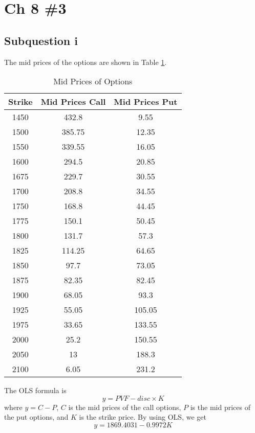 \documentclass{article}
\DeclareMathOperator{\1}{\mathit{1}}
\numberwithin{figure}{section} %
\numberwithin{table}{section}
\begin{document}
\section{Ch 8 \#3}
\subsection{Subquestion i}

The mid prices of the options are shown in Table \ref{tab:midPrice}.

	\begin{table}[hbtp]
	\centering
    \caption{\label{tab:midPrice}%
    Mid Prices of Options}
    \small
    \begin{tabular}{ccc}
    \hline\hline
    \bf{Strike} & \bf{Mid Prices Call} & \bf{Mid Prices Put}\\ 
    \hline
1450 & 432.8 & 9.55\\
1500 & 385.75 & 12.35\\
1550 & 339.55 & 16.05\\
1600 & 294.5 & 20.85\\
1675 & 229.7 & 30.55\\
1700 & 208.8 & 34.55\\
1750 & 168.8 & 44.45\\
1775 & 150.1 & 50.45\\
1800 & 131.7 & 57.3\\
1825 & 114.25 & 64.65\\
1850 & 97.7 & 73.05\\
1875 & 82.35 & 82.45\\
1900 & 68.05 & 93.3\\
1925 & 55.05 & 105.05\\
1975 & 33.65 & 133.55\\
2000 & 25.2 & 150.55\\
2050 & 13 & 188.3\\
2100 & 6.05 & 231.2\\
    \hline\hline
    \end{tabular}
    \end{table}
    
The OLS formula is
	\begin{equation*}
	y = PVF - disc \times K
	\end{equation*}
where $y = C - P$, $C$ is the mid prices of the call options, $P$ is the mid prices of the put options, and $K$ is the strike price. By using OLS, we get
	\begin{equation*}
	y = 1869.4031 - 0.9972K
	\end{equation*}
	
\end{document}
